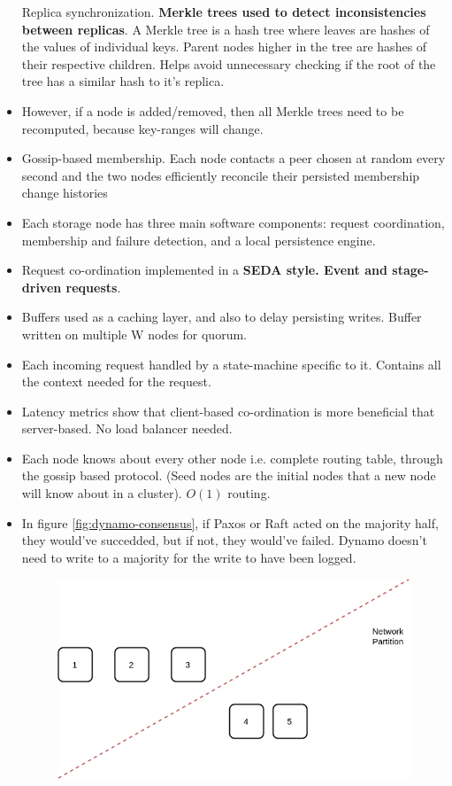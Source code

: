 \documentclass[parskip=half]{scrartcl}
\begin{document}
\begin{itemize}
        Replica synchronization. \textbf{Merkle trees used to detect inconsistencies between replicas}. A Merkle tree is a hash tree where leaves are hashes of the values of individual keys. Parent nodes higher in the tree are hashes of their respective children. Helps avoid unnecessary checking if the root of the tree has a similar hash to it's replica.
        \item
        However, if a node is added/removed, then all Merkle trees need to be recomputed, because key-ranges will change.
        \item
        Gossip-based membership.  Each node contacts a peer chosen at random every second and the two nodes efficiently reconcile their persisted membership change histories
        \item
        Each storage node has three main software components: request coordination, membership and failure detection, and a local persistence engine.
        \item
        Request co-ordination implemented in a \textbf{SEDA style. Event and stage-driven requests}.
        \item
        Buffers used as a caching layer, and also to delay persisting writes. Buffer written on multiple W nodes for quorum.
        \item
        Each incoming request handled by a state-machine specific to it. Contains all the context needed for the request.
        \item
        Latency metrics show that client-based co-ordination is more beneficial that server-based. No load balancer needed.
        \item
        Each node knows about every other node i.e. complete routing table, through the gossip based protocol. (Seed nodes are the initial nodes that a new node will know about in a cluster). $O(1)$ routing.
        \item
        In figure \ref{fig:dynamo-consensus}, if Paxos or Raft acted on the majority half, they would've succedded, but if not, they would've failed. Dynamo doesn't need to write to a majority for the write to have been logged.
        \begin{figure}[th]
            \centering
            \includegraphics[width=.5\textwidth]{dynamo-consensus}

\end{figure}
\end{itemize}
\end{document}
